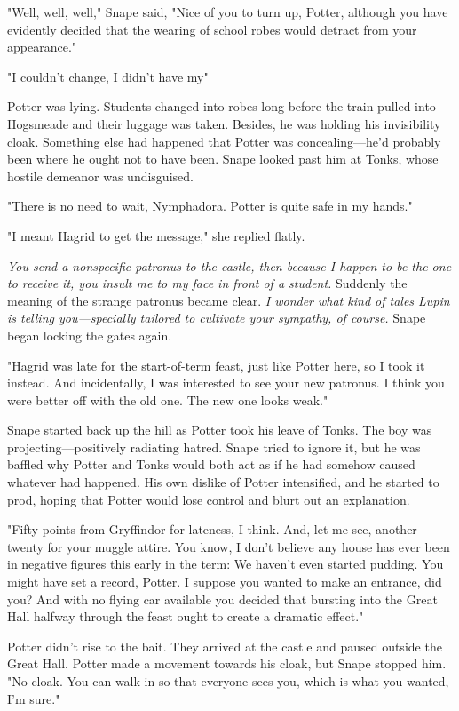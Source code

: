 "Well, well, well," Snape said, "Nice of you to turn up, Potter, although you have evidently decided that the wearing of school robes would detract from your appearance."

"I couldn't change, I didn't have my{\el}"

Potter was lying. Students changed into robes long before the train pulled into Hogsmeade and their luggage was taken. Besides, he was holding his invisibility cloak. Something else had happened that Potter was concealing—he'd probably been where he ought not to have been. Snape looked past him at Tonks, whose hostile demeanor was undisguised.

"There is no need to wait, Nymphadora. Potter is quite{\el} safe in my hands."

"I meant Hagrid to get the message," she replied flatly.

\emph{You send a nonspecific patronus to the castle, then because I happen to be the one to receive it, you insult me to my face in front of a student.} Suddenly the meaning of the strange patronus became clear. \emph{I wonder what kind of tales Lupin is telling you—specially tailored to cultivate your sympathy, of course.} Snape began locking the gates again.

"Hagrid was late for the start-of-term feast, just like Potter here, so I took it instead. And incidentally, I was interested to see your new patronus. I think you were better off with the old one. The new one looks weak."

Snape started back up the hill as Potter took his leave of Tonks. The boy was projecting—positively radiating hatred. Snape tried to ignore it, but he was baffled why Potter and Tonks would both act as if he had somehow caused whatever had happened. His own dislike of Potter intensified, and he started to prod, hoping that Potter would lose control and blurt out an explanation.

"Fifty points from Gryffindor for lateness, I think. And, let me see, another twenty for your muggle attire. You know, I don't believe any house has ever been in negative figures this early in the term: We haven't even started pudding. You might have set a record, Potter. I suppose you wanted to make an entrance, did you? And with no flying car available you decided that bursting into the Great Hall halfway through the feast ought to create a dramatic effect."

Potter didn't rise to the bait. They arrived at the castle and paused outside the Great Hall. Potter made a movement towards his cloak, but Snape stopped him. "No cloak. You can walk in so that everyone sees you, which is what you wanted, I'm sure."


